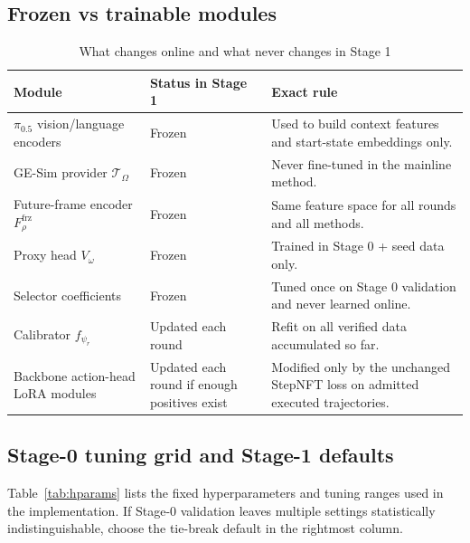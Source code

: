 \documentclass[10pt]{article}
\theoremstyle{plain}
\theoremstyle{definition}
\theoremstyle{remark}
\begin{document}
\subsection{Frozen vs trainable modules}
\begin{table}[H]
\centering
\small
\caption*{What changes online and what never changes in Stage 1}
\begin{tabularx}{\linewidth}{@{}p{3.1cm}p{2.0cm}X@{}}
\toprule
Module & Status in Stage 1 & Exact rule \\
\midrule
$\pi_{0.5}$ vision/language encoders & Frozen & Used to build context features and start-state embeddings only. \\
GE-Sim provider $\mathcal T_{\Omega}$ & Frozen & Never fine-tuned in the mainline method. \\
Future-frame encoder $F_{\rho}^{\mathrm{frz}}$ & Frozen & Same feature space for all rounds and all methods. \\
Proxy head $V_{\omega}$ & Frozen & Trained in Stage 0 + seed data only. \\
Selector coefficients & Frozen & Tuned once on Stage 0 validation and never learned online. \\
Calibrator $f_{\psi_r}$ & Updated each round & Refit on all verified data accumulated so far. \\
Backbone action-head LoRA modules & Updated each round if enough positives exist & Modified only by the unchanged StepNFT loss on admitted executed trajectories. \\
\bottomrule
\end{tabularx}
\end{table}


\subsection{Stage-0 tuning grid and Stage-1 defaults}
Table~\ref{tab:hparams} lists the fixed hyperparameters and tuning ranges used in the implementation. If Stage-0 validation leaves multiple settings statistically indistinguishable, choose the tie-break default in the rightmost column.
\end{document}
